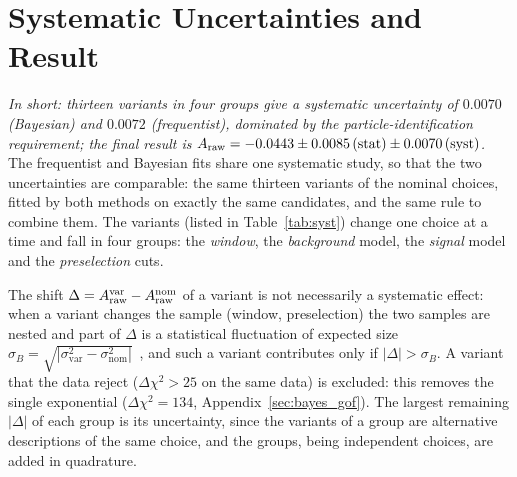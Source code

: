 \section{Systematic Uncertainties and Result}
\label{sec:syst}
\emph{In short: thirteen variants in four groups give a systematic uncertainty of $0.0070$ (Bayesian) and $0.0072$ (frequentist), dominated by the particle-identification requirement; the final result is $A_{\mathrm{raw}}=-0.0443\pm0.0085\,(\text{stat})\pm0.0070\,(\text{syst})$.}
The frequentist and Bayesian fits share one systematic study, so that the two uncertainties are comparable: the same thirteen variants of the nominal choices, fitted by both methods on exactly the same candidates, and the same rule to combine them. The variants (listed in Table~\ref{tab:syst}) change one choice at a time and fall in four groups: the \emph{window}, the \emph{background} model, the \emph{signal} model and the \emph{preselection} cuts.

The shift $\Delta=A_{\mathrm{raw}}^{\mathrm{var}}-A_{\mathrm{raw}}^{\mathrm{nom}}$ of a variant is not necessarily a systematic effect: when a variant changes the sample (window, preselection) the two samples are nested and part of $\Delta$ is a statistical fluctuation of expected size $\sigma_B=\sqrt{|\sigma_{\mathrm{var}}^2-\sigma_{\mathrm{nom}}^2|}$~\cite{barlow}, and such a variant contributes only if $|\Delta|>\sigma_B$. A variant that the data reject ($\Delta\chi^2>25$ on the same data) is excluded: this removes the single exponential ($\Delta\chi^2=134$, Appendix~\ref{sec:bayes_gof}). The largest remaining $|\Delta|$ of each group is its uncertainty, since the variants of a group are alternative descriptions of the same choice, and the groups, being independent choices, are added in quadrature.

